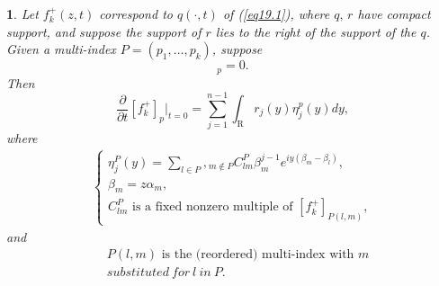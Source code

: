 \documentclass{surv-l}
\theoremstyle{plain}
\newtheorem{lemma}[theorem]{\sc{Lemma}}
\theoremstyle{definition}
\numberwithin{equation}{chapter}
\begin{document}
\begin{lemma}\label{lem19.4}
Let $f_{k}^{+}(z,t)$  correspond to $q(\cdot, t)$ of \emph{(\ref{eq19.1})},  where $q,\,r$  have
compact support, and suppose the support of $r$ lies to the right of the support of the $q$. Given a multi-index $P= (p_{1},\ldots,p_{k})$, suppose
\begin{equation*}
[f_{k}^{+}(z, 0)]_{p}=0.
\end{equation*}
Then
\setcounter{equation}{4}
\begin{equation}\label{eq19.5}
\frac{\partial}{\partial t}[f_{k}^{+}]_{p}|_{t=0}=\sum_{j=1}^{n-1}\int_{\mathrm{R}}r_{j}(y)\eta_{j}^{p}(y)dy,
\end{equation}
where
\begin{align}\label{eq19.6}
\left\{\begin{array}{l}
\eta_{j}^{P}(y)=\sum_{l\in P},{}_{m\not\in P}C_{lm}^{P}\beta_{m}^{j-1}e^{iy(\beta_{m}-\beta_{l})},\\
\beta_{m}=z\alpha_{m},\\
C_{lm}^{P}\text{ is  a  fixed  nonzero  multiple  of }[f_{k}^{+}]_{P(l,m)},
\end{array}\right.
\end{align}
and
\begin{align}\label{eq19.7}
&P(l, m)\text{ is the (reordered) multi-index with }m \\ \nonumber
&substituted \ for\  l\ in\ P.
\end{align}
\end{lemma}
\end{document}
